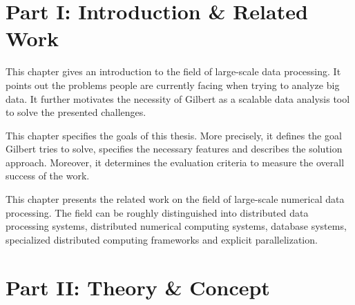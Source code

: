 \clearemptydoublepage

{}

\thispagestyle{empty}

\begin{center}
\end{center}

\section*{Part I: Introduction \& Related Work}

\vspace{3mm}


\noindent This chapter gives an introduction to the field of large-scale data processing. 
It points out the problems people are currently facing when trying to analyze big data. 
It further motivates the necessity of Gilbert as a scalable data analysis tool to solve the presented challenges.

\vspace{3mm}


\noindent This chapter specifies the goals of this thesis. 
More precisely, it defines the goal Gilbert tries to solve, specifies the necessary features and describes the solution approach. 
Moreover, it determines the evaluation criteria to measure the overall success of the work.

\vspace{3mm}


\noindent This chapter presents the related work on the field of large-scale numerical data processing. 
The field can be roughly distinguished into distributed data processing systems, distributed numerical computing systems, database systems, specialized distributed computing frameworks and explicit parallelization.

\vspace{3mm}

\section*{Part II: Theory \& Concept}

\vspace{3mm}

